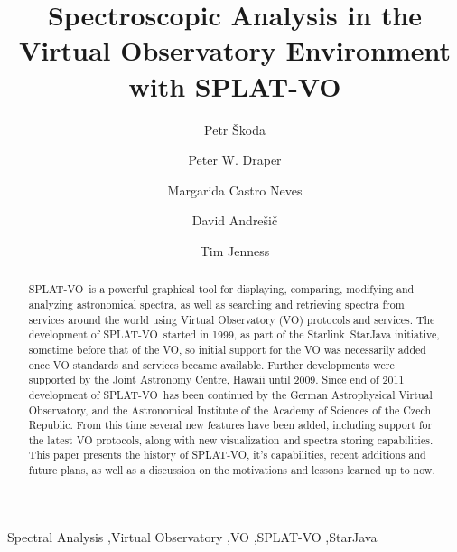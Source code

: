 \documentclass[final,authoryear,5p,times,twocolumn]{elsarticle}
\newcommand{\splatvo}{{\textsf{\small{SPLAT-VO}}}}
\newcommand{\Starlink}{\textsf{\small Starlink}}
\begin{document}
\begin{frontmatter}

\title{Spectroscopic Analysis in the Virtual Observatory Environment with SPLAT-VO}

\author[OND]{Petr \v{S}koda}
\author[DUR]{Peter W. Draper}
\author[HDB]{Margarida Castro Neves}
\author[VSB]{David Andre\v{s}i\v{c}}
\author[COR]{Tim Jenness}

\address[OND]{Astronomical Institute of the Academy of Sciences,Fri\v{c}ova~298, 251\,65, Ond\v{r}ejov, Czech Republic}
\address[DUR]{Department of Physics, Institute for Computational
Cosmology, University of Durham, South Road, Durham DH1 3LE, UK}
\address[HDB]{Universit\"a{}t Heidelberg, Astronomisches Rechen-Institut,
M\"o{}nchhofstra\ss{}e 12--14, 69120 Heidelberg, Germany}
\address[VSB]{Department of Computer Science, Faculty of Electrical
Engineering and Computer Science, V\v{S}B --- Technical University of Ostrava\\
 17. listopadu 15, 708 33 Ostrava-Poruba, Czech Republic}
\address[COR]{Department of Astronomy, Cornell University, Ithaca, NY 14853, USA}


\begin{abstract}
  \splatvo\ is a powerful graphical tool for displaying, comparing, modifying
  and analyzing astronomical spectra, as well as searching and retrieving
  spectra from services around the world using Virtual Observatory (VO)
  protocols and services. The development of \splatvo\ started in 1999, as part
  of the \Starlink\ StarJava initiative, sometime before that of the VO, so
  initial support for the VO was necessarily added once VO standards and
  services became available. Further developments were supported by
  the Joint Astronomy Centre,
  Hawaii until 2009. Since end of 2011 development of \splatvo\ has been
  continued by the German Astrophysical Virtual Observatory, and the
  Astronomical Institute of the Academy of Sciences of the Czech Republic.
  From this time several new features have been added, including support for
  the latest VO protocols, along with new visualization and spectra storing
  capabilities. This paper presents the history of \splatvo, it's
  capabilities, recent additions and future plans, as well as a discussion on
  the motivations and lessons learned up to now.
\end{abstract}
\begin{keyword}
Spectral Analysis \sep Virtual Observatory \sep VO \sep SPLAT-VO \sep StarJava
\end{keyword}
\end{frontmatter}
\end{document}

